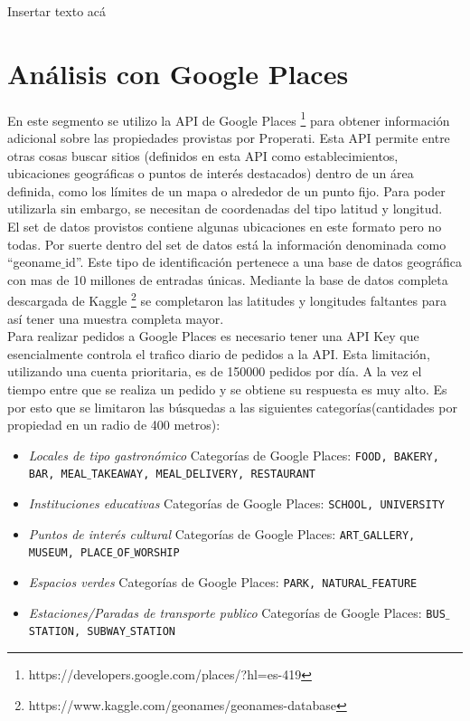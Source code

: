 \documentclass[a4paper, 10pt]{article}
\def\code#1{\texttt{#1}}
\begin{document}
			\FloatBarrier
				
			Insertar texto acá
	
	
	
	\part{Análisis con Google Places}
		En este segmento se utilizo la API de Google Places 
		\footnote{https://developers.google.com/places/?hl=es-419} para obtener información adicional 
		sobre las propiedades provistas por Properati. Esta API permite entre otras cosas buscar 
		sitios (definidos en esta API como establecimientos, ubicaciones geográficas o puntos de 
		interés destacados) dentro de un área definida, como los límites de un mapa o alrededor de 
		un punto fijo. Para poder utilizarla sin embargo, se necesitan de coordenadas del tipo 
		latitud y longitud.\\ 
		El set de datos provistos contiene algunas ubicaciones en este formato pero no todas. 
		Por suerte dentro del set de datos está la información denominada como “geoname$\_$id”. 
		Este tipo de identificación pertenece a una base de datos geográfica con mas de 10 
		millones de entradas únicas. 
		Mediante la base de datos completa descargada de Kaggle
		\footnote{https://www.kaggle.com/geonames/geonames-database} se completaron las 
		latitudes y longitudes faltantes para así tener una muestra completa mayor.\\
		Para realizar pedidos a Google Places es necesario tener una API Key que esencialmente 
		controla el trafico diario de pedidos a la API. Esta limitación, utilizando una cuenta 
		prioritaria, es de 150000 pedidos por día. A la vez el tiempo entre que se realiza un 
		pedido y se obtiene su respuesta es muy alto. Es por esto que se limitaron las búsquedas 
		a las siguientes categorías(cantidades por propiedad en un radio de 400 metros):
		
		\begin{itemize}
		\item \emph{Locales de tipo gastronómico}
			\subitem Categorías de Google Places: \code{FOOD, BAKERY, BAR, MEAL$\_$TAKEAWAY, MEAL$\_$DELIVERY, RESTAURANT}
		\item \emph{Instituciones educativas}
			\subitem Categorías de Google Places: \code{SCHOOL, UNIVERSITY}
		\item \emph{Puntos de interés cultural} 
			\subitem Categorías de Google Places: \code{ART$\_$GALLERY, MUSEUM, PLACE$\_$OF$\_$WORSHIP}
		\item \emph{Espacios verdes} 
			\subitem Categorías de Google Places: \code{PARK, NATURAL$\_$FEATURE}
		\item \emph{Estaciones/Paradas de transporte publico}
			\subitem Categorías de Google Places: \code{BUS$\_$STATION, SUBWAY$\_$STATION}			
		\end{itemize}
		
\end{document}
